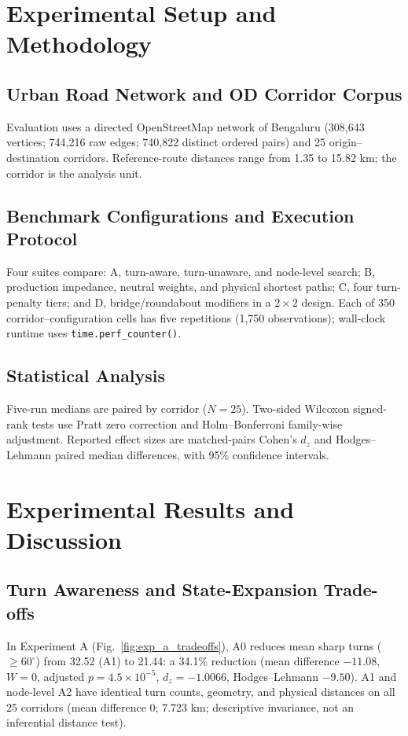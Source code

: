 \documentclass[11pt,conference]{IEEEtran}
\begin{document}
\section{Experimental Setup and Methodology}

\subsection{Urban Road Network and OD Corridor Corpus}

Evaluation uses a directed OpenStreetMap network of Bengaluru (308,643 vertices; 744,216 raw edges; 740,822 distinct ordered pairs) and 25 origin--destination corridors. Reference-route distances range from 1.35 to 15.82 km; the corridor is the analysis unit.

\subsection{Benchmark Configurations and Execution Protocol}

Four suites compare: A, turn-aware, turn-unaware, and node-level search; B, production impedance, neutral weights, and physical shortest paths; C, four turn-penalty tiers; and D, bridge/roundabout modifiers in a $2\times2$ design. Each of 350 corridor--configuration cells has five repetitions (1,750 observations); wall-clock runtime uses \texttt{time.perf\_counter()}.

\subsection{Statistical Analysis}

Five-run medians are paired by corridor ($N=25$). Two-sided Wilcoxon signed-rank tests use Pratt zero correction and Holm--Bonferroni family-wise adjustment. Reported effect sizes are matched-pairs Cohen's $d_z$ and Hodges--Lehmann paired median differences, with 95\% confidence intervals.

\section{Experimental Results and Discussion}

\subsection{Turn Awareness and State-Expansion Trade-offs}

In Experiment A (Fig.~\ref{fig:exp_a_tradeoffs}), A0 reduces mean sharp turns ($\ge60^\circ$) from 32.52 (A1) to 21.44: a 34.1\% reduction (mean difference $-11.08$, $W=0$, adjusted $p=4.5\times10^{-5}$, $d_z=-1.0066$, Hodges--Lehmann $-9.50$). A1 and node-level A2 have identical turn counts, geometry, and physical distances on all 25 corridors (mean difference 0; 7.723 km; descriptive invariance, not an inferential distance test).
\end{document}
